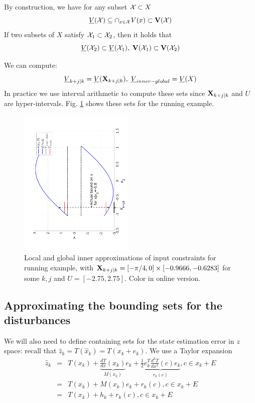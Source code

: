 By construction, we have for any subset $\mathcal{X} \subset X$
\begin{equation}
\label{eq:Vbounds}
\underline{V}(\mathcal{X}) \subseteq \cap_{x \in \mathcal{X}} V(x) \subset \mathbf{V}(\mathcal{X})
\end{equation}
If two subsets of $X$ satisfy $\mathcal{X}_1 \subset \mathcal{X}_2$, then it holds that 
\begin{equation}
\label{eq:V inclusions}
\underline{V}(\mathcal{X}_2) \subset \underline{V}(\mathcal{X}_1), \; \mathbf{V}(\mathcal{X}_1) \subset \mathbf{V}(\mathcal{X}_2)
\end{equation}

We can compute:
\begin{equation}
\label{eq:Vkj Vmax}
\underline{V}_{k+j|k}  = \underline{V}(\mathbf{X}_{k+j|k}), \; \underline{V}_{inner-global} = \underline{V}(X)
\end{equation}
In practice we use interval arithmetic to compute these sets since $\mathbf{X}_{k+j|k}$ and $U$ are hyper-intervals.
Fig. \ref{fig:err bounds toy} shows these sets for the running example.
\begin{figure}
	\includegraphics[angle=270,width=0.49\textwidth]{figs/InputToy.pdf}
	\caption{Local and global inner approximations of input constraints for running example, with $\mathbf{X}_{k+j|k} =  [-\pi/4,0]\times[-0.9666,-0.6283]$ for some $k,j$ and $U = [-2.75,2.75]$. Color in online version.}
	\label{fig:err bounds toy}
\end{figure}





\subsection{Approximating the bounding sets for the disturbances}
\label{sec:approx dist}
We will also need to define containing sets for the state estimation error in $z$ space:
recall that $\hat{z}_k = T(\hat{x}_k) = T(x_k+e_k)$. 
We use a Taylor expansion
\begin{eqnarray}
\label{eq:taylor expansion T}
\hat{z}_k &=& T(x_k) + \underbrace{\frac{dT}{dx}(x_k)}_{M(x_k)}e_k+ \underbrace{\frac{1}{2}e_k^T \frac{d^2T}{dx^2}(c)e_k}_{r_k(c)}, c \in x_k + E \nonumber 
\\
&=& T(x_k) + M(x_k)e_k+ r_k(c), c \in x_k + E \nonumber
\\
&=& T(x_k) + h_{k}+ r_k(c), c \in x_k + E \nonumber
\end{eqnarray}

